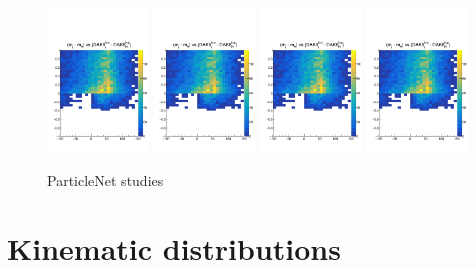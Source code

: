 \documentclass[10pt]{article}
\begin{document}
\begin{figure}
    \centering
    \includegraphics[page=5,width=0.24\textwidth]{../plots/diff2Dstudy.pdf}
    \includegraphics[page=6,width=0.24\textwidth]{../plots/diff2Dstudy.pdf}
    \includegraphics[page=7,width=0.24\textwidth]{../plots/diff2Dstudy.pdf}
    \includegraphics[page=8,width=0.24\textwidth]{../plots/diff2Dstudy.pdf}
    \caption{ParticleNet studies}
    \label{figs:PN_diff_2D}
\end{figure}

\section{Kinematic distributions}
\end{document}
